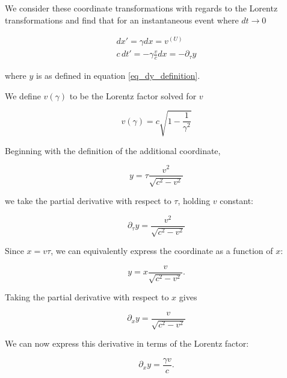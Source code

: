 \documentclass[pdflatex,sn-mathphys-num]{sn-jnl}%
\theoremstyle{thmstyleone}%
\theoremstyle{thmstyletwo}%
\theoremstyle{thmstylethree}%
\begin{document}
We consider these coordinate transformations with regards to the Lorentz transformations and find that for an instantaneous event where $dt \to 0$

\begin{equation}
\boxed{
\begin{gathered}
    dx' = \gamma dx = v^{\left( U \right)}\\
    c\,dt' = -\gamma\frac{v}{c}dx = - \partial_\tau y
\end{gathered}
}
\end{equation}

where $y$ is as defined in equation \ref{eq_dy_definition}.

We define $v \left( \gamma \right)$ to be the Lorentz factor solved for $v$

\begin{equation}\label{eq_v_of_gamma}
    v\left( \gamma \right) = c \sqrt{1 - \frac{1}{\gamma^{2}}}
\end{equation}

Beginning with the definition of the additional coordinate,

\begin{equation}\label{eq_dy_definition}
    y = \tau \frac{v^2}{\sqrt{c^2-v^2}}
\end{equation}

we take the partial derivative with respect to $\tau$, holding $v$ constant:

\begin{equation}
    \boxed{
    \partial_\tau y =
    \frac{v^2}{\sqrt{c^2-v^2}}
    }
\end{equation}

Since $x=v\tau$, we can equivalently express the coordinate
as a function of $x$:

\begin{equation}
    y = x\frac{v}{\sqrt{c^2-v^2}}.
\end{equation}

Taking the partial derivative with respect to $x$ gives

\begin{equation}
    \boxed{
    \partial_x y =
    \frac{v}{\sqrt{c^2-v^2}}
    }
\end{equation}

We can now express this derivative in terms of the Lorentz factor:

\begin{equation}
    \partial_x y =
    \frac{\gamma v}{c}.
\end{equation}
\end{document}
